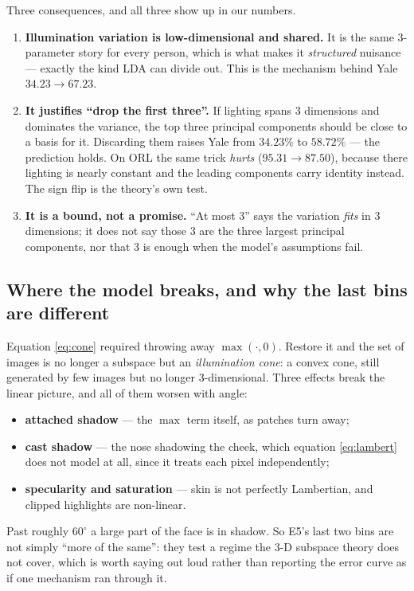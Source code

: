 \documentclass[11pt]{article}
\begin{document}
Three consequences, and all three show up in our numbers.
\begin{enumerate}
\item \textbf{Illumination variation is low-dimensional and shared.} It is the
  same 3-parameter story for every person, which is what makes it \emph{structured}
  nuisance --- exactly the kind LDA can divide out. This is the mechanism behind
  Yale $34.23\to67.23$.
\item \textbf{It justifies ``drop the first three''.} If lighting spans 3
  dimensions and dominates the variance, the top three principal components
  should be close to a basis for it. Discarding them raises Yale from $34.23\%$
  to $58.72\%$ --- the prediction holds. On ORL the same trick \emph{hurts}
  ($95.31\to87.50$), because there lighting is nearly constant and the leading
  components carry identity instead. The sign flip is the theory's own test.
\item \textbf{It is a bound, not a promise.} ``At most 3'' says the variation
  \emph{fits} in 3 dimensions; it does not say those 3 are the three largest
  principal components, nor that 3 is enough when the model's assumptions fail.
\end{enumerate}

\subsection{Where the model breaks, and why the last bins are different}
Equation \eqref{eq:cone} required throwing away $\max(\cdot,0)$. Restore it and
the set of images is no longer a subspace but an \emph{illumination cone}: a
convex cone, still generated by few images but no longer 3-dimensional. Three
effects break the linear picture, and all of them worsen with angle:
\begin{itemize}
\item \textbf{attached shadow} --- the $\max$ term itself, as patches turn away;
\item \textbf{cast shadow} --- the nose shadowing the cheek, which
  equation \eqref{eq:lambert} does not model at all, since it treats each pixel
  independently;
\item \textbf{specularity and saturation} --- skin is not perfectly Lambertian,
  and clipped highlights are non-linear.
\end{itemize}
Past roughly $60^\circ$ a large part of the face is in shadow. So E5's last two
bins are not simply ``more of the same'': they test a regime the 3-D subspace
theory does not cover, which is worth saying out loud rather than reporting the
error curve as if one mechanism ran through it.
\end{document}
